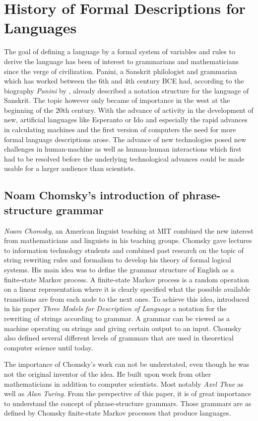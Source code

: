 \documentclass{article}
\begin{document}
\section{History of Formal Descriptions for Languages}
The goal of defining a language by a formal system of variables and rules to derive the language has been of interest to grammarians and mathematicians since the verge of civilization. Panini, a Sanskrit philologist and grammarian which has worked between the 6th and 4th century BCE had, according to the biography \textit{Panini} by \citet{bhate2002panini}, already described a notation structure for the language of Sanskrit. The topic however only became of importance in the west at the beginning of the 20th century. With the advance of activity in the development of new, artificial languages like Esperanto or Ido and especially the rapid advances in calculating machines and the first version of computers the need for more formal language descriptions arose. The advance of new technologies posed new challenges in human-machine as well as human-human interactions which first had to be resolved before the underlying technological advances could be made usable for a larger audience than scientists.

\subsection{Noam Chomsky's introduction of phrase-structure grammar}
\textit{Noam Chomsky}, an American linguist teaching at MIT combined the new interest from mathematicians and linguists in his teaching groups. Chomsky gave lectures to information technology students and combined past research on the topic of string rewriting rules and formalism to develop his theory of formal logical systems. His main idea was to define the grammar structure of English as a finite-state Markov process. A finite-state Markov process is a random operation on a linear representation where it is clearly specified what the possible available transitions are from each node to the next ones. To achieve this idea, \citet{1056813} introduced in his paper \textit{Three Models for Description of Language} a notation for the rewriting of strings according to grammar. A grammar can be viewed as a machine operating on strings and giving certain output to an input. Chomsky also defined several different levels of grammars that are used in theoretical computer science until today.

The importance of Chomsky’s work can not be understated, even though he was not the original inventor of the idea. He built upon work from other mathematicians in addition to computer scientists. Most notably \textit{Axel Thue} as well as \textit{Alan Turing}. From the perspective of this paper, it is of great importance to understand the concept of phrase-structure grammars. Those grammars are as defined by Chomsky finite-state Markov processes that produce languages.
\end{document}
